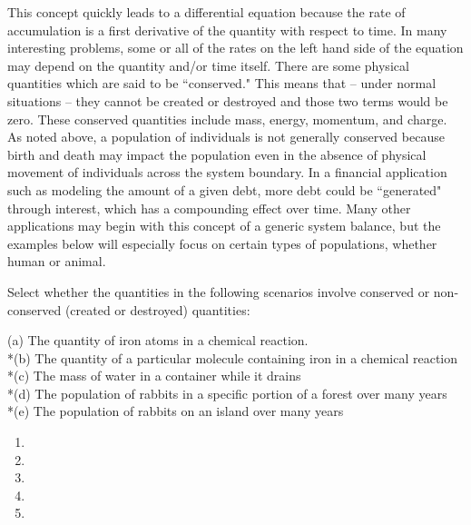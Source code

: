 \documentclass{ximera}
\begin{document}
This concept quickly leads to a differential equation because the rate of accumulation is a first derivative of the quantity with respect to time.  In many interesting problems, some or all of the rates on the left hand side of the equation may depend on the quantity and/or time itself.  There are some physical quantities which are said to be ``conserved."  This means that -- under normal situations – they cannot be created or destroyed and those two terms would be zero.  These conserved quantities include mass, energy, momentum, and charge.  As noted above, a population of individuals is not generally conserved because birth and death may impact the population even in the absence of physical movement of individuals across the system boundary.  In a financial application such as modeling the amount of a given debt, more debt could be ``generated" through interest, which has a compounding effect over time.  Many other applications may begin with this concept of a generic system balance, but the examples below will especially focus on certain types of populations, whether human or animal.
 
\begin{problem}
Select whether the quantities in the following scenarios involve conserved or non-conserved (created or destroyed) quantities:

(a) The quantity of iron atoms in a chemical reaction.  
\\*(b) The quantity of a particular molecule containing iron in a chemical reaction 
\\*(c) The mass of water in a container while it drains 
\\*(d) The population of rabbits in a specific portion of a forest over many years 
\\*(e) The population of rabbits on an island over many years 


 \begin{enumerate}
     \item {}
     \item {}
     \item {}
     \item {}
     \item {}
 \end{enumerate}
\end{problem} 
 
\end{document}

